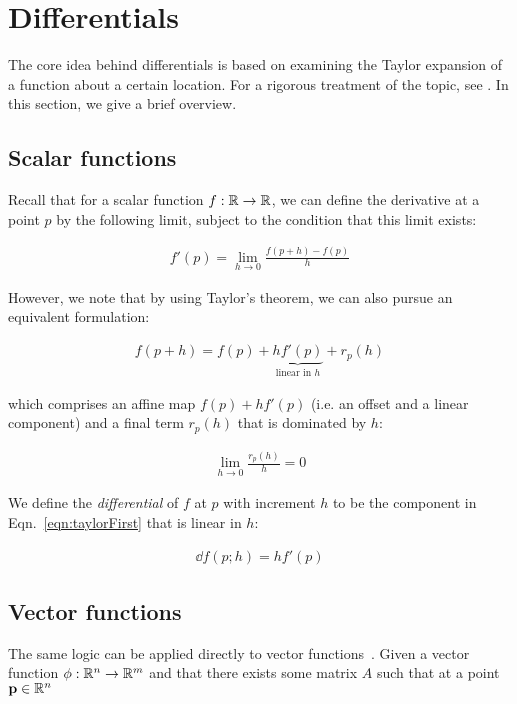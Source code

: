\chapter{Differentials} \label{app:differentials}

The core idea behind differentials is based on examining the Taylor expansion of a function about a certain location. For a rigorous treatment of the topic, see \cite{magnus1988matrix}.  In this section, we give a brief overview.

\section{Scalar functions}

Recall that for a scalar function $f: \mathbb{R} \to \mathbb{R}$, we can define the derivative at a point $p$ by the following limit, subject to the condition that this limit exists:

\begin{align*}
  f'(p) = \lim_{h\to 0}\frac{f(p + h) - f(p)}{h} 
\end{align*}

However, we note that by using Taylor's theorem, we can also pursue an equivalent formulation:

\begin{align}
  f(p + h) = f(p) + \underbrace{h f'(p)}_{\text{linear in $h$}} + r_p(h) \label{eqn:taylorFirst}
\end{align}

which comprises an affine map $f(p) + h f'(p)$ (i.e. an offset and a linear component) and a final term $r_p(h)$ that is dominated by $h$:

\begin{align}
  \lim_{h\to 0} \frac{r_p(h)}{h} = 0
\end{align}

We define the \textit{differential} of $f$ at $p$ with increment $h$ to be the component in Eqn.~\ref{eqn:taylorFirst} that is linear in $h$:

\begin{align}
  {\dd} f (p ; h) = h f'(p)
\end{align}

\section{Vector functions}

The same logic can be applied directly to vector functions~\cite{magnus1988matrix}.  Given a vector function $\phi: \mathbb{R}^n \to \mathbb{R}^m$ and that there exists some matrix $A$ such that at a point $\mathbf{p} \in \mathbb{R}^n$


